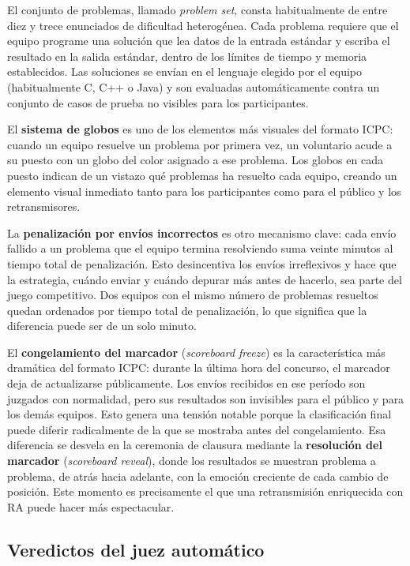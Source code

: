 El conjunto de problemas, llamado \textit{problem set}, consta habitualmente de entre diez y trece enunciados de dificultad heterogénea. Cada problema requiere que el equipo programe una solución que lea datos de la entrada estándar y escriba el resultado en la salida estándar, dentro de los límites de tiempo y memoria establecidos. Las soluciones se envían en el lenguaje elegido por el equipo (habitualmente C, C++ o Java) y son evaluadas automáticamente contra un conjunto de casos de prueba no visibles para los participantes.

El \textbf{sistema de globos} es uno de los elementos más visuales del formato ICPC: cuando un equipo resuelve un problema por primera vez, un voluntario acude a su puesto con un globo del color asignado a ese problema. Los globos en cada puesto indican de un vistazo qué problemas ha resuelto cada equipo, creando un elemento visual inmediato tanto para los participantes como para el público y los retransmisores.

La \textbf{penalización por envíos incorrectos} es otro mecanismo clave: cada envío fallido a un problema que el equipo termina resolviendo suma veinte minutos al tiempo total de penalización. Esto desincentiva los envíos irreflexivos y hace que la estrategia, cuándo enviar y cuándo depurar más antes de hacerlo, sea parte del juego competitivo. Dos equipos con el mismo número de problemas resueltos quedan ordenados por tiempo total de penalización, lo que significa que la diferencia puede ser de un solo minuto.

El \textbf{congelamiento del marcador} (\textit{scoreboard freeze}) es la característica más dramática del formato ICPC: durante la última hora del concurso, el marcador deja de actualizarse públicamente. Los envíos recibidos en ese período son juzgados con normalidad, pero sus resultados son invisibles para el público y para los demás equipos. Esto genera una tensión notable porque la clasificación final puede diferir radicalmente de la que se mostraba antes del congelamiento. Esa diferencia se desvela en la ceremonia de clausura mediante la \textbf{resolución del marcador} (\textit{scoreboard reveal}), donde los resultados se muestran problema a problema, de atrás hacia adelante, con la emoción creciente de cada cambio de posición. Este momento es precisamente el que una retransmisión enriquecida con RA puede hacer más espectacular.

\subsection{Veredictos del juez automático}

